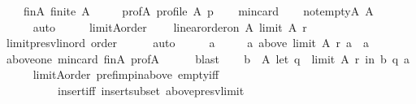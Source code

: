 \begin{isabellebody}
\ \ \ \ finA{\isacharcolon}{\kern0pt}\ {\isachardoublequoteopen}finite\ A{\isachardoublequoteclose}\ \isanewline
\ \ \ \ profA{\isacharcolon}{\kern0pt}\ {\isachardoublequoteopen}profile\ A\ p{\isachardoublequoteclose}\isanewline
\ \ \isamarkupfalse%
\ min{\isacharunderscore}{\kern0pt}{}{\isacharunderscore}{\kern0pt}card\isanewline
\ \ \isamarkupfalse%
\ not{\isacharunderscore}{\kern0pt}empty{\isacharunderscore}{\kern0pt}A{\isacharcolon}{\kern0pt}\ {\isachardoublequoteopen}A\ {\isasymnoteq}\ {\isacharbraceleft}{\kern0pt}{\isacharbraceright}{\kern0pt}{\isachardoublequoteclose}\isanewline
\ \ \ \ \isamarkupfalse%
\ auto\isanewline
\ \ \isamarkupfalse%
\ \isamarkupfalse%
\ limitA{\isacharunderscore}{\kern0pt}order{\isacharcolon}{\kern0pt}\isanewline
\ \ \ \ {\isachardoublequoteopen}linear{\isacharunderscore}{\kern0pt}order{\isacharunderscore}{\kern0pt}on\ A\ {\isacharparenleft}{\kern0pt}limit\ A\ r{\isacharparenright}{\kern0pt}{\isachardoublequoteclose}\isanewline
\ \ \ \ \isamarkupfalse%
\ limit{\isacharunderscore}{\kern0pt}presv{\isacharunderscore}{\kern0pt}lin{\isacharunderscore}{\kern0pt}ord\ order\isanewline
\ \ \ \ \isamarkupfalse%
\ auto\isanewline
\ \ \isamarkupfalse%
\ \isamarkupfalse%
\ a\ \isanewline
\ \ \ \ a{\isacharcolon}{\kern0pt}\ {\isachardoublequoteopen}above\ {\isacharparenleft}{\kern0pt}limit\ A\ r{\isacharparenright}{\kern0pt}\ a\ {\isacharequal}{\kern0pt}\ {\isacharbraceleft}{\kern0pt}a{\isacharbraceright}{\kern0pt}{\isachardoublequoteclose}\isanewline
\ \ \ \ \isamarkupfalse%
\ above{\isacharunderscore}{\kern0pt}one\ min{\isacharunderscore}{\kern0pt}{}{\isacharunderscore}{\kern0pt}card\ finA\ profA\isanewline
\ \ \ \ \isamarkupfalse%
\ blast\isanewline
\ \ \isamarkupfalse%
\ {\isachardoublequoteopen}{\isasymforall}b\ {\isasymin}\ A{\isachardot}{\kern0pt}\ let\ q\ {\isacharequal}{\kern0pt}\ limit\ A\ r\ in\ {\isacharparenleft}{\kern0pt}b\ {\isasympreceq}\isactrlsub q\ a{\isacharparenright}{\kern0pt}{\isachardoublequoteclose}\isanewline
\ \ \ \ \isamarkupfalse%
\ limitA{\isacharunderscore}{\kern0pt}order\ pref{\isacharunderscore}{\kern0pt}imp{\isacharunderscore}{\kern0pt}in{\isacharunderscore}{\kern0pt}above\ empty{\isacharunderscore}{\kern0pt}iff\isanewline
\ \ \ \ \ \ \ \ \ \ insert{\isacharunderscore}{\kern0pt}iff\ insert{\isacharunderscore}{\kern0pt}subset\ above{\isacharunderscore}{\kern0pt}presv{\isacharunderscore}{\kern0pt}limit\isanewline

\end{isabellebody}
